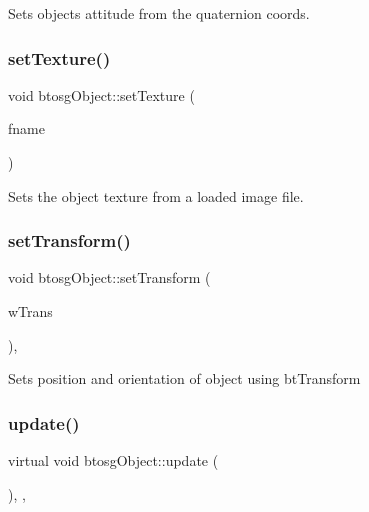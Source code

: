 Sets objects attitude from the quaternion coords. \mbox{\label{classbtosgObject_aff54acbc7c66811efb0cf2838107a241}} 
\subsubsection{\texorpdfstring{setTexture()}{setTexture()}}
{\footnotesize\ttfamily void btosg\+Object\+::set\+Texture (\begin{DoxyParamCaption}\item[{char const $\ast$}]{fname }\end{DoxyParamCaption})\hspace{0.3cm}{\ttfamily [inherited]}}

Sets the object texture from a loaded image file. \mbox{\label{classbtosgObject_ad33fcab26c0c83ccab6dca6906e8cdb0}} 
\subsubsection{\texorpdfstring{setTransform()}{setTransform()}}
{\footnotesize\ttfamily void btosg\+Object\+::set\+Transform (\begin{DoxyParamCaption}\item[{const bt\+Transform \&}]{w\+Trans }\end{DoxyParamCaption})\hspace{0.3cm}{\ttfamily [inline]}, {\ttfamily [inherited]}}

Sets position and orientation of object using bt\+Transform \mbox{\label{classbtosgObject_a342917817dfde62554f83da8e0d5110b}} 
\subsubsection{\texorpdfstring{update()}{update()}}
{\footnotesize\ttfamily virtual void btosg\+Object\+::update (\begin{DoxyParamCaption}{ }\end{DoxyParamCaption})\hspace{0.3cm}{\ttfamily [inline]}, {\ttfamily [virtual]}, {\ttfamily [inherited]}}

